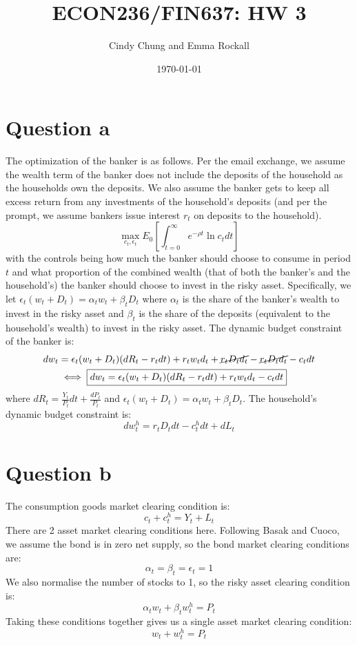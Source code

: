 \documentclass{article}
\title{ECON236/FIN637: HW 3}
\author{Cindy Chung and Emma Rockall}
\date{\today}
\begin{document}
\maketitle

\section*{Question a}
The optimization of the banker is as follows. Per the email exchange, we assume the wealth term of the banker does not include the deposits of the household as the households own the deposits. We also assume the banker gets to keep all excess return from any investments of the household's deposits (and per the prompt, we assume bankers issue interest $r_t$ on deposits to the household).
\[
\max_{c_t, \epsilon_t} E_{0}\left[\int_{t=0}^{\infty} e^{-\rho t} \ln c_{t} d t\right]
\]
with the controls being how much the banker should choose to consume in period $t$ and what proportion of the combined wealth (that of both the banker's and the household's) the banker should choose to invest in the risky asset. Specifically, we let $\epsilon_t (w_t + D_t)= \alpha_t w_t + \beta_t D_t$ where $\alpha_t$ is the share of the banker's wealth to invest in the risky asset and $\beta_t$ is the share of the deposits (equivalent to the household's wealth) to invest in the risky asset. The dynamic budget constraint of the banker is:
\[ \begin{aligned}
    d w_t &= \epsilon_t (w_t + D_t) (d R_t - r_t d t)  + r_t w_t d_t + \cancel{r_t D_t d_t} - \cancel{r_t D_t d_t} - c_t d t \\
    & \iff \boxed{d w_t= \epsilon_t (w_t + D_t) (d R_t - r_t d t)  + r_t w_t d_t - c_t d t }
\end{aligned} \]
where $\boxed{d R_t = \frac{Y_t}{P_t} d t + \frac{d P_t}{P_t}}$ and $\boxed{\epsilon_t (w_t + D_t) = \alpha_tw_t + \beta_tD_t}$.
The household's dynamic budget constraint is:
\[
\boxed{d w_t^h = r_t D_t d t  - c_t^h d t + d L_t}  
\]
\section*{Question b}
The consumption goods market clearing condition is:
\[
\boxed{c_t + c_t^h = Y_t + L_t    }
\]
There are 2 asset market clearing conditions here. Following Basak and Cuoco, we assume the bond is in zero net supply, so the bond market clearing conditions are:
\[
\alpha_t=\beta_t=\epsilon_t = 1
\]
We also normalise the number of stocks to 1, so the risky asset clearing condition is:
\[
\boxed{\alpha_tw_t + \beta_tw^h_t = P_t}
\]
Taking these conditions together gives us a single asset market clearing condition:
\[
\boxed{w_t + w_t^h = P_t    }
\]
\end{document}

